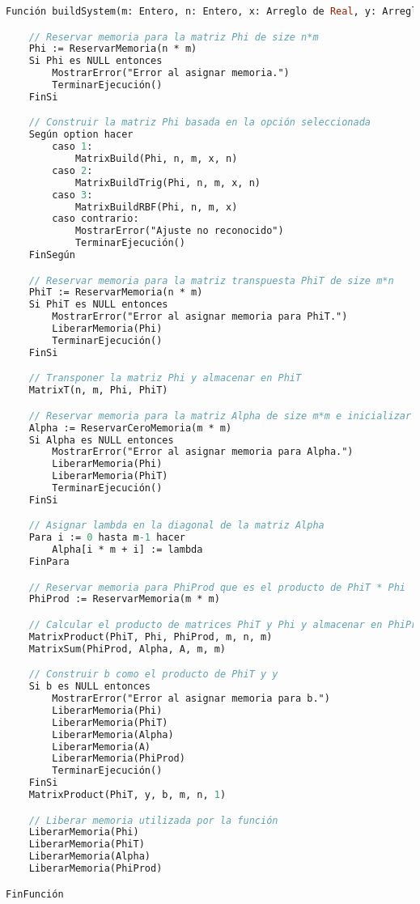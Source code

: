 \documentclass{article}
\begin{document}
\begin{lstlisting}[language=Pascal, caption={Pseudocódigo de la función buildSystem.}]
Función buildSystem(m: Entero, n: Entero, x: Arreglo de Real, y: Arreglo de Real, A: Arreglo de Real, b: Arreglo de Real, lambda: Real, option: Entero)

    // Reservar memoria para la matriz Phi de size n*m
    Phi := ReservarMemoria(n * m)
    Si Phi es NULL entonces
        MostrarError("Error al asignar memoria.")
        TerminarEjecución()
    FinSi

    // Construir la matriz Phi basada en la opción seleccionada
    Según option hacer
        caso 1:
            MatrixBuild(Phi, n, m, x, n)
        caso 2:
            MatrixBuildTrig(Phi, n, m, x, n)
        caso 3:
            MatrixBuildRBF(Phi, n, m, x)
        caso contrario:
            MostrarError("Ajuste no reconocido")
            TerminarEjecución()
    FinSegún

    // Reservar memoria para la matriz transpuesta PhiT de size m*n
    PhiT := ReservarMemoria(n * m)
    Si PhiT es NULL entonces
        MostrarError("Error al asignar memoria para PhiT.")
        LiberarMemoria(Phi)
        TerminarEjecución()
    FinSi

    // Transponer la matriz Phi y almacenar en PhiT
    MatrixT(n, m, Phi, PhiT)

    // Reservar memoria para la matriz Alpha de size m*m e inicializar en cero
    Alpha := ReservarCeroMemoria(m * m)
    Si Alpha es NULL entonces
        MostrarError("Error al asignar memoria para Alpha.")
        LiberarMemoria(Phi)
        LiberarMemoria(PhiT)
        TerminarEjecución()
    FinSi

    // Asignar lambda en la diagonal de la matriz Alpha
    Para i := 0 hasta m-1 hacer
        Alpha[i * m + i] := lambda
    FinPara

    // Reservar memoria para PhiProd que es el producto de PhiT * Phi
    PhiProd := ReservarMemoria(m * m)

    // Calcular el producto de matrices PhiT y Phi y almacenar en PhiProd
    MatrixProduct(PhiT, Phi, PhiProd, m, n, m)
    MatrixSum(PhiProd, Alpha, A, m, m)

    // Construir b como el producto de PhiT y y
    Si b es NULL entonces
        MostrarError("Error al asignar memoria para b.")
        LiberarMemoria(Phi)
        LiberarMemoria(PhiT)
        LiberarMemoria(Alpha)
        LiberarMemoria(A)
        LiberarMemoria(PhiProd)
        TerminarEjecución()
    FinSi
    MatrixProduct(PhiT, y, b, m, n, 1)

    // Liberar memoria utilizada por la función
    LiberarMemoria(Phi)
    LiberarMemoria(PhiT)
    LiberarMemoria(Alpha)
    LiberarMemoria(PhiProd)

FinFunción
\end{lstlisting}
\end{document}
